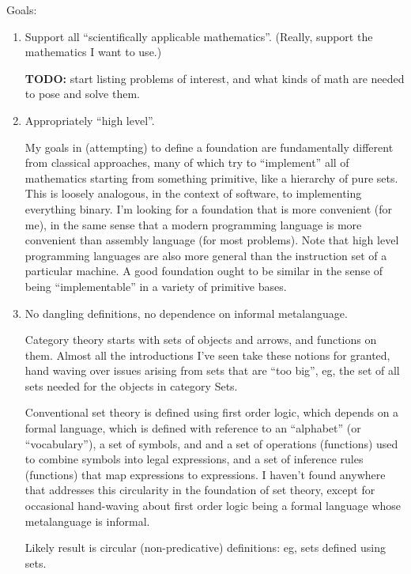 \documentclass[11pt,openany]{article}
\begin{document}
Goals:
\begin{enumerate}
  \item Support all ``scientifically applicable mathematics''.
  (Really, support the mathematics I want to use.) \par
  \textbf{TODO:} start listing problems of interest,
  and what kinds of math are needed to pose and solve them.
  
  \item Appropriately ``high level''. \par
  My goals in (attempting) to define a foundation are fundamentally
different from classical approaches,
many of which try to ``implement'' all of mathematics starting from
something primitive, like a hierarchy of pure sets.
This is loosely analogous, in the context of software,
to implementing everything binary.
I'm looking for a foundation that is more convenient (for me),
in the same sense that a modern programming language is more
convenient than assembly language (for most problems).
Note that high level programming languages are also more general
than the instruction set of a particular machine.
A good foundation ought to be similar in the sense of being
``implementable'' in a variety of primitive bases.

  \item No dangling definitions, no dependence on informal metalanguage.
   \par
  Category theory starts with sets of objects and arrows, 
  and functions on them. Almost all the introductions I've seen 
  take these notions for granted, hand waving over issues arising
  from sets that are ``too big'', eg, the set of all sets needed
  for the objects in category Sets.
  \par
  Conventional set theory is defined using first order logic,
  which depends on a formal language, which is defined with
  reference to an ``alphabet'' (or ``vocabulary''), 
  a set of symbols, and and a set of
  operations (functions) used to combine symbols into legal 
  expressions, and a set of inference rules (functions) that map
  expressions to expressions. I haven't found anywhere that
  addresses this circularity in the foundation of set theory,
  except for occasional hand-waving about first order logic
  being a formal language whose metalanguage is informal.
  \par
  Likely result is circular (non-predicative) definitions:
  eg, sets defined using sets.
  

\end{enumerate}
\end{document}

